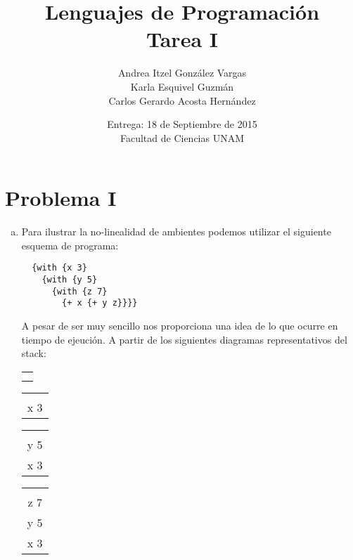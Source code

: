 \documentclass[12pt]{article}
\title{Lenguajes de Programación \\ Tarea I}
\author{Andrea Itzel González Vargas \\ Karla Esquivel Guzmán \\ Carlos Gerardo Acosta Hernández}
\date{Entrega: 18 de Septiembre de 2015 \\ Facultad de Ciencias UNAM}
\begin{document}
\maketitle
\section{Problema I}
\begin{enumerate}[a)]
\item \indent Para ilustrar la no-linealidad de ambientes podemos utilizar el siguiente esquema de programa:
\begin{verbatim}
  {with {x 3}
    {with {y 5}
      {with {z 7}
        {+ x {+ y z}}}}
\end{verbatim}
A pesar de ser muy sencillo nos proporciona una idea de lo que ocurre en tiempo de ejeución. A partir de los siguientes diagramas representativos
del stack:\par
\begin{table}[ht]
  \centering
  \begin{minipage}{.10\linewidth}
    \begin{tabular}{|c|}
      \hline \\ [-2.5 ex]
         \\ [0 ex]
      \hline
    \end{tabular}
  \end{minipage}%
  \begin{minipage}{.15\linewidth}
    \begin{tabular}{|c|}
      \hline \\ [-2.5 ex]    
      x 3 \\ [0 ex]
      \hline 
    \end{tabular}
  \end{minipage}%
  \begin{minipage}{.15\linewidth}
    \begin{tabular}{|c|}
      \hline \\ [-2.5 ex]
      y 5 \\ [0 ex]
      \hline
      x 3 \\ [0 ex]
      \hline
    \end{tabular}
  \end{minipage}%
  \begin{minipage}{.15\linewidth}
    \begin{tabular}{|c|}
      \hline \\ [-2.5 ex]
      z 7 \\ [0 ex]
      \hline
      y 5 \\ [0 ex]
      \hline
      x 3 \\ [0 ex]
      \hline
    \end{tabular}
  \end{minipage}
\end{table}


\end{enumerate}
\end{document}
